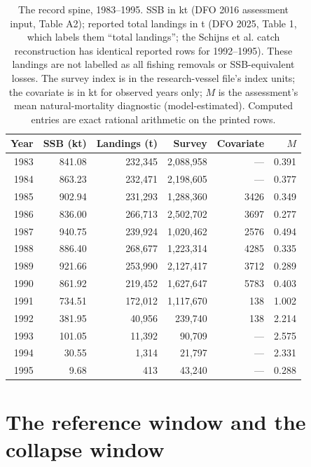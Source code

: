 \documentclass[10pt,twocolumn]{article}
\theoremstyle{plain}
\theoremstyle{remark}
\begin{document}
\begin{table}[t]
\centering
\scriptsize
\setlength{\tabcolsep}{2.8pt}
\caption{The record spine, 1983--1995. SSB in kt (DFO 2016 assessment
input, Table A2); reported total landings in t (DFO 2025, Table 1,
which labels them ``total landings''; the Schijns et al. catch
reconstruction has identical reported rows for 1992--1995). These
landings are not labelled as all fishing removals or SSB-equivalent
losses. The survey index is in the research-vessel file's index units;
the covariate is in kt for observed years only; \(M\) is the
assessment's mean natural-mortality diagnostic (model-estimated).
Computed entries are exact rational arithmetic on the printed rows.}
\label{tab:spine}
\begin{tabular}{@{}r r r r r r@{}}
\toprule
Year & SSB (kt) & Landings (t) & Survey & Covariate & \(M\) \\
\midrule
1983 & 841.08 & 232{,}345 & 2{,}088{,}958 & --- & 0.391 \\
1984 & 863.23 & 232{,}471 & 2{,}198{,}605 & --- & 0.377 \\
1985 & 902.94 & 231{,}293 & 1{,}288{,}360 & 3426 & 0.349 \\
1986 & 836.00 & 266{,}713 & 2{,}502{,}702 & 3697 & 0.277 \\
1987 & 940.75 & 239{,}924 & 1{,}020{,}462 & 2576 & 0.494 \\
1988 & 886.40 & 268{,}677 & 1{,}223{,}314 & 4285 & 0.335 \\
1989 & 921.66 & 253{,}990 & 2{,}127{,}417 & 3712 & 0.289 \\
1990 & 861.92 & 219{,}452 & 1{,}627{,}647 & 5783 & 0.403 \\
1991 & 734.51 & 172{,}012 & 1{,}117{,}670 & 138 & 1.002 \\
1992 & 381.95 & 40{,}956 & 239{,}740 & 138 & 2.214 \\
1993 & 101.05 & 11{,}392 & 90{,}709 & --- & 2.575 \\
1994 & 30.55 & 1{,}314 & 21{,}797 & --- & 2.331 \\
1995 & 9.68 & 413 & 43{,}240 & --- & 0.288 \\
\bottomrule
\end{tabular}
\end{table}

\section{The reference window and the collapse window}\label{windows}
\end{document}
